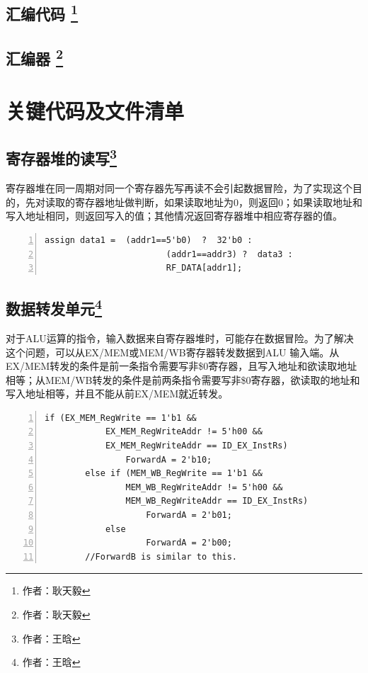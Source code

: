 \documentclass{article}
\begin{document}
        \subsection{汇编代码 \protect\footnote{作者：耿天毅}}

        \subsection{汇编器 \protect\footnote{作者：耿天毅}}

    \section{关键代码及文件清单}
        \subsection{寄存器堆的读写\protect\footnote{作者：王晗}}
            寄存器堆在同一周期对同一个寄存器先写再读不会引起数据冒险，为了实现这个目的，先对读取的寄存器地址做判断，如果读取地址为0，则返回0；如果读取地址和写入地址相同，则返回写入的值；其他情况返回寄存器堆中相应寄存器的值。
            \begin{Verbatim}[frame=lines,numbers=left,stepnumber=5,label={regfile.v}]
        assign data1 =  (addr1==5'b0)  ?  32'b0 :
                        (addr1==addr3) ?  data3 :
                        RF_DATA[addr1];
            \end{Verbatim}

        \subsection{数据转发单元\protect\footnote{作者：王晗}}
            对于ALU运算的指令，输入数据来自寄存器堆时，可能存在数据冒险。为了解决这个问题，可以从EX/MEM或MEM/WB寄存器转发数据到ALU 输入端。从EX/MEM转发的条件是前一条指令需要写非\$0寄存器，且写入地址和欲读取地址相等；从MEM/WB转发的条件是前两条指令需要写非\$0寄存器，欲读取的地址和写入地址相等，并且不能从前EX/MEM就近转发。
            \begin{Verbatim}[frame=lines,numbers=left,stepnumber=5,label={ForwardUnit.v}]
        if (EX_MEM_RegWrite == 1'b1 &&
        	EX_MEM_RegWriteAddr != 5'h00 &&
        	EX_MEM_RegWriteAddr == ID_EX_InstRs)
        		ForwardA = 2'b10;
        else if (MEM_WB_RegWrite == 1'b1 &&
        		MEM_WB_RegWriteAddr != 5'h00 &&
        		MEM_WB_RegWriteAddr == ID_EX_InstRs)
        			ForwardA = 2'b01;
        	else
        			ForwardA = 2'b00;
        //ForwardB is similar to this.
            \end{Verbatim}
\end{document}
